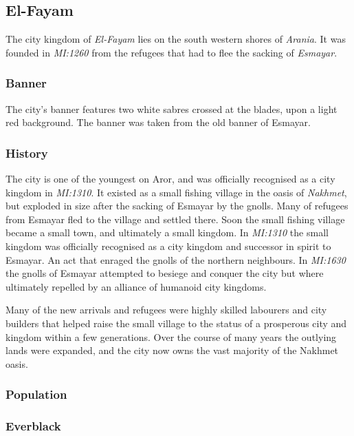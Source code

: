 \subsection*{El-Fayam}

The city kingdom of \emph{El-Fayam} lies on the south western shores of
\emph{Arania}. It was founded in \emph{MI:1260} from the refugees that
had to flee the sacking of \emph{Esmayar}.

\subsubsection*{Banner}

The city's banner features two white sabres crossed at the blades, upon
a light red background. The banner was taken from the old banner of Esmayar.

\subsubsection*{History}

The city is one of the youngest on Aror, and was officially recognised
as a city kingdom in \emph{MI:1310}. It existed as a small fishing village
in the oasis of \emph{Nakhmet}, but exploded in size after the sacking of
Esmayar by the gnolls. Many of refugees from Esmayar fled to the village
and settled there. Soon the small fishing village became a small town,
and ultimately a small kingdom. In \emph{MI:1310} the small kingdom was
officially recognised as a city kingdom and successor in spirit to
Esmayar. An act that enraged the gnolls of the northern neighbours. In
\emph{MI:1630} the gnolls of Esmayar attempted to besiege and conquer the
city but where ultimately repelled by an alliance of humanoid city kingdoms.

Many of the new arrivals and refugees were highly skilled labourers and city
builders that helped raise the small village to the status of a prosperous
city and kingdom within a few generations. Over the course of many years the
outlying lands were expanded, and the city now owns the vast majority of
the Nakhmet oasis.

\subsubsection*{Population}



\subsubsection*{Everblack}

